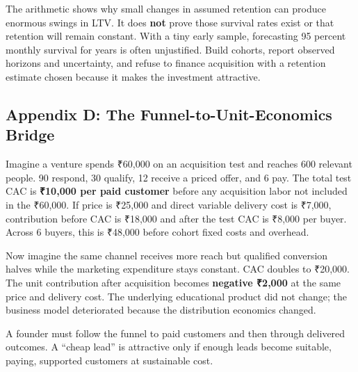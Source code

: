 The arithmetic shows why small changes in assumed retention can produce enormous swings in LTV. It does \textbf{not} prove those survival rates exist or that retention will remain constant. With a tiny early sample, forecasting 95 percent monthly survival for years is often unjustified. Build cohorts, report observed horizons and uncertainty, and refuse to finance acquisition with a retention estimate chosen because it makes the investment attractive.

\subsection*{Appendix D: The Funnel-to-Unit-Economics Bridge}

Imagine a venture spends ₹60,000 on an acquisition test and reaches 600 relevant people. 90 respond, 30 qualify, 12 receive a priced offer, and 6 pay. The total test CAC is \textbf{₹10,000 per paid customer} before any acquisition labor not included in the ₹60,000. If price is ₹25,000 and direct variable delivery cost is ₹7,000, contribution before CAC is ₹18,000 and after the test CAC is ₹8,000 per buyer. Across 6 buyers, this is ₹48,000 before cohort fixed costs and overhead.

Now imagine the same channel receives more reach but qualified conversion halves while the marketing expenditure stays constant. CAC doubles to ₹20,000. The unit contribution after acquisition becomes \textbf{negative ₹2,000} at the same price and delivery cost. The underlying educational product did not change; the business model deteriorated because the distribution economics changed.

A founder must follow the funnel to paid customers and then through delivered outcomes. A ``cheap lead'' is attractive only if enough leads become suitable, paying, supported customers at sustainable cost.
